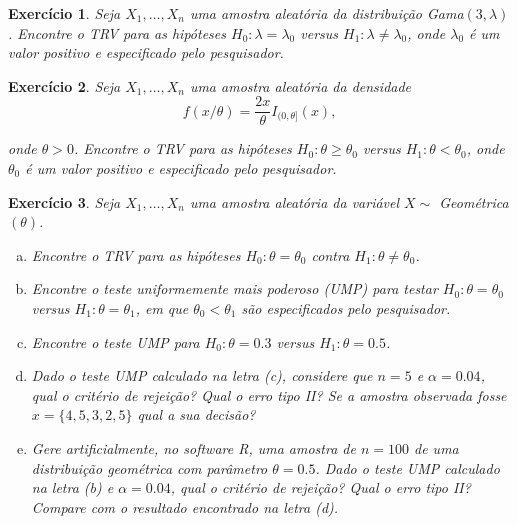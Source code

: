 \documentclass[letter,11pt]{article}
\newtheorem{exer}{Exercício}
\begin{document}
\begin{exer} \rm Seja $X_1, \ldots, X_n$ uma amostra aleatória da distribuição Gama$(3, \lambda)$. Encontre o TRV para as hipóteses $H_0:\lambda=\lambda_0$ versus $H_1: \lambda \neq \lambda_0$, onde $\lambda_0$ é um valor positivo e especificado pelo pesquisador.
\end{exer}


\begin{exer} \rm Seja $X_1, \ldots, X_n$ uma amostra aleatória da densidade
$$
f(x/\theta)=\frac{2x}{\theta}I_{(0, \theta]}(x),
$$

onde $\theta>0$.  Encontre o TRV para as hipóteses $H_0:\theta\geq\theta_0$ versus $H_1: \theta < \theta_0$, onde $\theta_0$ é um valor positivo e especificado pelo pesquisador.
\end{exer}


\begin{exer} \rm Seja $X_1, \ldots, X_n$ uma amostra aleatória da variável $X \sim $ Geométrica$(\theta)$.

\begin{enumerate}[a)]
\item Encontre o TRV para as hipóteses $H_0: \theta=\theta_0$ contra $H_1: \theta \neq \theta_0$.

\item Encontre o teste uniformemente mais poderoso (UMP) para testar $H_0: \theta=\theta_0$ versus $H_1: \theta=\theta_1$, em que $\theta_0<\theta_1$ são especificados pelo pesquisador.

\item  Encontre o teste UMP para $H_0: \theta=0.3$ versus $H_1: \theta=0.5$.

\item Dado o teste UMP calculado na letra (c), considere que $n=5$ e $\alpha=0.04$, qual o critério de rejeição? Qual o erro tipo II? Se a amostra observada fosse $x=\{4,5,3,2,5\}$ qual a sua decisão?

\item Gere artificialmente, no software R, uma amostra de $n= 100$ de uma distribuição geométrica com parâmetro $\theta=0.5$.  Dado o teste UMP calculado na letra (b) e $\alpha=0.04$, qual o critério de rejeição? Qual o erro tipo II? Compare com o resultado encontrado na letra (d).

\end{enumerate}
\end{exer}
\end{document}
